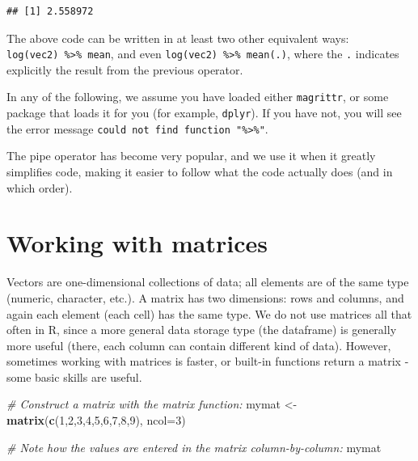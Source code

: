 \documentclass[]{book}
\newenvironment{Shaded}{\begin{snugshade}}{\end{snugshade}}
\newcommand{\CommentTok}[1]{\textcolor[rgb]{0.56,0.35,0.01}{\textit{#1}}}
\newcommand{\DataTypeTok}[1]{\textcolor[rgb]{0.13,0.29,0.53}{#1}}
\newcommand{\DecValTok}[1]{\textcolor[rgb]{0.00,0.00,0.81}{#1}}
\newcommand{\KeywordTok}[1]{\textcolor[rgb]{0.13,0.29,0.53}{\textbf{#1}}}
\newcommand{\NormalTok}[1]{#1}
\newcommand{\StringTok}[1]{\textcolor[rgb]{0.31,0.60,0.02}{#1}}
\begin{document}
\begin{verbatim}
## [1] 2.558972
\end{verbatim}

The above code can be written in at least two other equivalent ways: \texttt{log(vec2)\ \%\textgreater{}\%\ mean}, and even \texttt{log(vec2)\ \%\textgreater{}\%\ mean(.)}, where the \texttt{.} indicates explicitly the result from the previous operator.

In any of the following, we assume you have loaded either \texttt{magrittr}, or some package that loads it for you (for example, \texttt{dplyr}). If you have not, you will see the error message \texttt{could\ not\ find\ function\ "\%\textgreater{}\%"}.

The pipe operator has become very popular, and we use it when it greatly simplifies code, making it easier to follow what the code actually does (and in which order).

\hypertarget{matrices}{%
\section{Working with matrices}\label{matrices}}

Vectors are one-dimensional collections of data; all elements are of the same type (numeric, character, etc.). A matrix has two dimensions: rows and columns, and again each element (each cell) has the same type. We do not use matrices all that often in R, since a more general data storage type (the dataframe) is generally more useful (there, each column can contain different kind of data). However, sometimes working with matrices is faster, or built-in functions return a matrix - some basic skills are useful.

\begin{Shaded}
\begin{Highlighting}[]
\CommentTok{# Construct a matrix with the matrix function:}
\NormalTok{mymat <-}\StringTok{ }\KeywordTok{matrix}\NormalTok{(}\KeywordTok{c}\NormalTok{(}\DecValTok{1}\NormalTok{,}\DecValTok{2}\NormalTok{,}\DecValTok{3}\NormalTok{,}\DecValTok{4}\NormalTok{,}\DecValTok{5}\NormalTok{,}\DecValTok{6}\NormalTok{,}\DecValTok{7}\NormalTok{,}\DecValTok{8}\NormalTok{,}\DecValTok{9}\NormalTok{), }\DataTypeTok{ncol=}\DecValTok{3}\NormalTok{)}

\CommentTok{# Note how the values are entered in the matrix column-by-column:}
\NormalTok{mymat}
\end{Highlighting}
\end{Shaded}
\end{document}
